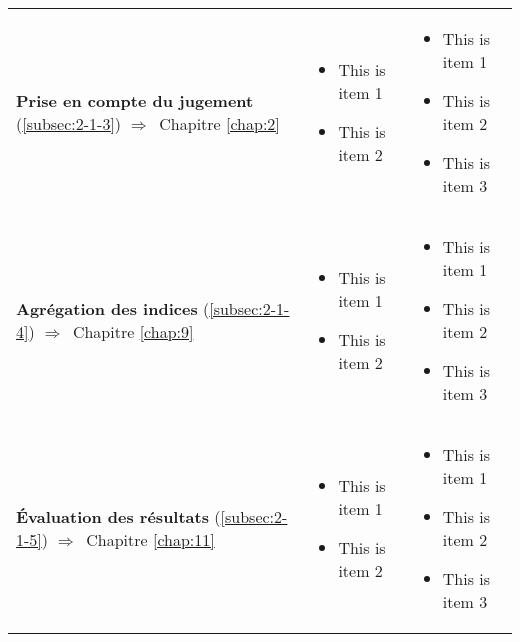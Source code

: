 \begin{tabular}{L{5cm}L{4.5cm}L{4.5cm}}
  \textbf{Prise en compte du jugement} (\ref{subsec:2-1-3})  $\Longrightarrow$~Chapitre \ref{chap:2}
& \begin{minipage}{4cm}
    \begin{itemize}
    \item This is item 1
    \item This is item 2
    \end{itemize}
  \end{minipage}& \begin{minipage}{4cm}
    \begin{itemize}
    \item This is item 1
    \item This is item 2
    \item This is item 3
    \end{itemize}
  \end{minipage} \\
  
  \textbf{Agrégation des indices} (\ref{subsec:2-1-4}) $\Longrightarrow$~Chapitre \ref{chap:9}
& \begin{minipage}{4cm}
    \begin{itemize}
    \item This is item 1
    \item This is item 2
    \end{itemize}
  \end{minipage}& \begin{minipage}{4cm}
    \begin{itemize}
    \item This is item 1
    \item This is item 2
    \item This is item 3
    \end{itemize}
  \end{minipage} \\
  
  \textbf{Évaluation des résultats} (\ref{subsec:2-1-5})
  $\Longrightarrow$~Chapitre \ref{chap:11}
& \begin{minipage}{4cm}
    \begin{itemize}
    \item This is item 1
    \item This is item 2
    \end{itemize}
  \end{minipage}& \begin{minipage}{4cm}
    \begin{itemize}
    \item This is item 1
    \item This is item 2
    \item This is item 3
    \end{itemize}
  \end{minipage}\\
  
  \bottomrule
\end{tabular}
